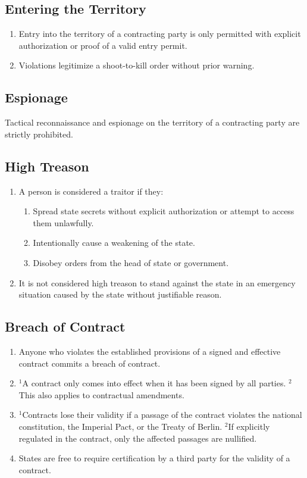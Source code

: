 \documentclass{article}
\begin{document}
\subsection{Entering the Territory}
\begin{enumerate}[(1)]
    \item Entry into the territory of a contracting party is only permitted with explicit authorization or proof of a valid entry permit.
    \item Violations legitimize a shoot-to-kill order without prior warning.
\end{enumerate}

\subsection{Espionage}
Tactical reconnaissance and espionage on the territory of a contracting party are strictly prohibited.

\subsection{High Treason}
\begin{enumerate}[(1)]
    \item A person is considered a traitor if they:
    \begin{enumerate}[1.]
        \item Spread state secrets without explicit authorization or attempt to access them unlawfully.
        \item Intentionally cause a weakening of the state.
        \item Disobey orders from the head of state or government.
    \end{enumerate}
    \item It is not considered high treason to stand against the state in an emergency situation caused by the state without justifiable reason.
\end{enumerate}

\subsection{Breach of Contract}
\begin{enumerate}[(1)]
    \item Anyone who violates the established provisions of a signed and effective contract commits a breach of contract.
    \item ${^1}$A contract only comes into effect when it has been signed by all parties. ${^2}$This also applies to contractual amendments.
    \item ${^1}$Contracts lose their validity if a passage of the contract violates the national constitution, the Imperial Pact, or the Treaty of Berlin. ${^2}$If explicitly regulated in the contract, only the affected passages are nullified.
    \item States are free to require certification by a third party for the validity of a contract.
\end{enumerate}
\end{document}
